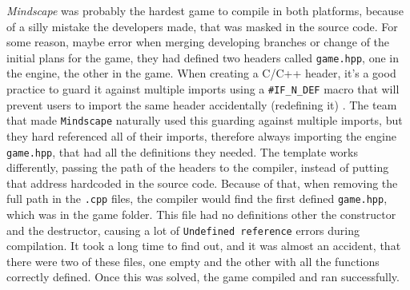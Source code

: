 \textit{Mindscape} was probably the hardest game to compile in both platforms, because of a silly mistake the developers made, that was masked in the source code. For some reason, maybe error when merging developing branches or change of the initial plans for the game, they had defined two headers called \texttt{game.hpp}, one in the engine, the other in the game. When creating a C/C++ header, it's a good practice to guard it against multiple imports using a \texttt{\#IF\_N\_DEF} macro that will prevent users to import the same header accidentally (redefining it) \cite{disch_2009}. The team that made \texttt{Mindscape} naturally used this guarding against multiple imports, but they hard referenced all of their imports, therefore always importing the engine \texttt{game.hpp}, that had all the definitions they needed. The template works differently, passing the path of the headers to the compiler, instead of putting that address hardcoded in the source code. Because of that, when removing the full path in the \texttt{.cpp} files, the compiler would find the first defined \texttt{game.hpp}, which was in the game folder. This file had no definitions other the constructor and the destructor, causing a lot of \texttt{Undefined reference} errors during compilation. It took a long time to find out, and it was almost an accident, that there were two of these files, one empty and the other with all the functions correctly defined. Once this was solved, the game compiled and ran successfully.

